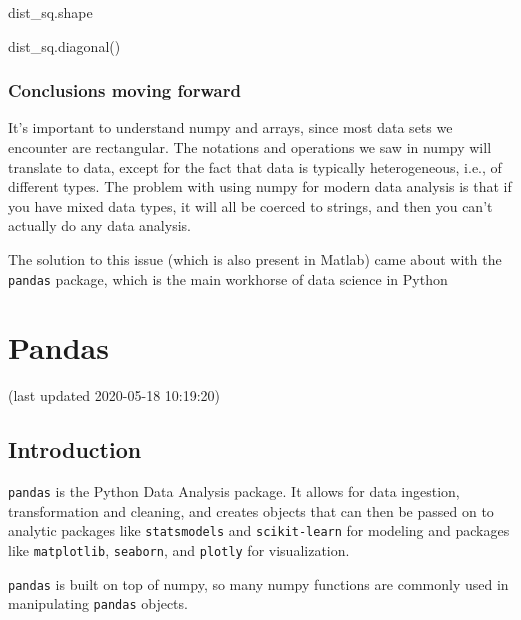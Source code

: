 \documentclass[
  letterpaper,
]{scrbook}
\newenvironment{Shaded}{\begin{snugshade}}{\end{snugshade}}
\newcommand{\NormalTok}[1]{#1}
\begin{document}
\begin{Shaded}
\begin{Highlighting}[]
\NormalTok{dist\_sq.shape}
\end{Highlighting}
\end{Shaded}

\begin{Shaded}
\begin{Highlighting}[]
\NormalTok{dist\_sq.diagonal()}
\end{Highlighting}
\end{Shaded}

\hypertarget{conclusions-moving-forward}{%
\subsection{Conclusions moving forward}\label{conclusions-moving-forward}}

It's important to understand numpy and arrays, since most data sets we encounter are rectangular. The notations and operations we saw in numpy will translate to data, except for the fact that data is typically heterogeneous, i.e., of different types. The problem with using numpy for modern data analysis is that if you have mixed data types, it will all be coerced to strings, and then you can't actually do any data analysis.

The solution to this issue (which is also present in Matlab) came about with the \texttt{pandas} package, which is the main workhorse of data science in Python

\hypertarget{pandas}{%
\chapter{Pandas}\label{pandas}}

(last updated 2020-05-18 10:19:20)

\hypertarget{introduction-1}{%
\section{Introduction}\label{introduction-1}}

\texttt{pandas} is the Python Data Analysis package. It allows for data ingestion, transformation and cleaning, and creates objects that can then be passed on to analytic packages like \texttt{statsmodels} and \texttt{scikit-learn} for modeling and packages like \texttt{matplotlib}, \texttt{seaborn}, and \texttt{plotly} for visualization.

\texttt{pandas} is built on top of numpy, so many numpy functions are commonly used in manipulating \texttt{pandas} objects.
\end{document}
